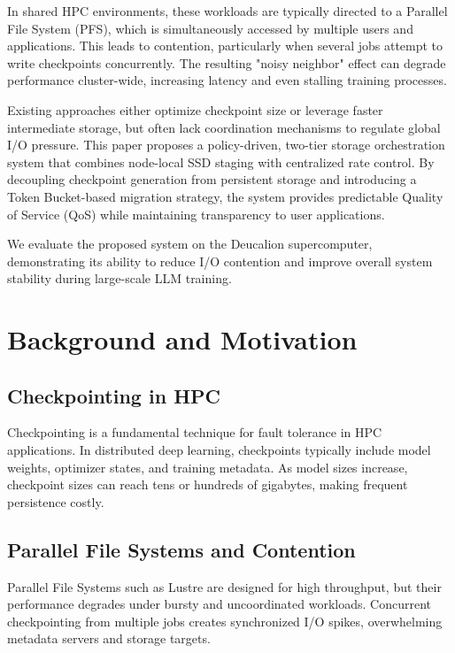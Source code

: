 \documentclass[conference,a4paper]{IEEEtran}
\begin{document}
In shared HPC environments, these workloads are typically directed to a Parallel File System (PFS), which is simultaneously accessed by multiple users and applications. This leads to contention, particularly when several jobs attempt to write checkpoints concurrently. The resulting "noisy neighbor" effect can degrade performance cluster-wide, increasing latency and even stalling training processes.

Existing approaches either optimize checkpoint size or leverage faster intermediate storage, but often lack coordination mechanisms to regulate global I/O pressure. This paper proposes a policy-driven, two-tier storage orchestration system that combines node-local SSD staging with centralized rate control. By decoupling checkpoint generation from persistent storage and introducing a Token Bucket-based migration strategy, the system provides predictable Quality of Service (QoS) while maintaining transparency to user applications.

We evaluate the proposed system on the Deucalion supercomputer, demonstrating its ability to reduce I/O contention and improve overall system stability during large-scale LLM training.

\section{Background and Motivation}

\subsection{Checkpointing in HPC}

Checkpointing is a fundamental technique for fault tolerance in HPC applications. In distributed deep learning, checkpoints typically include model weights, optimizer states, and training metadata. As model sizes increase, checkpoint sizes can reach tens or hundreds of gigabytes, making frequent persistence costly.

\subsection{Parallel File Systems and Contention}

Parallel File Systems such as Lustre are designed for high throughput, but their performance degrades under bursty and uncoordinated workloads. Concurrent checkpointing from multiple jobs creates synchronized I/O spikes, overwhelming metadata servers and storage targets.
\end{document}
